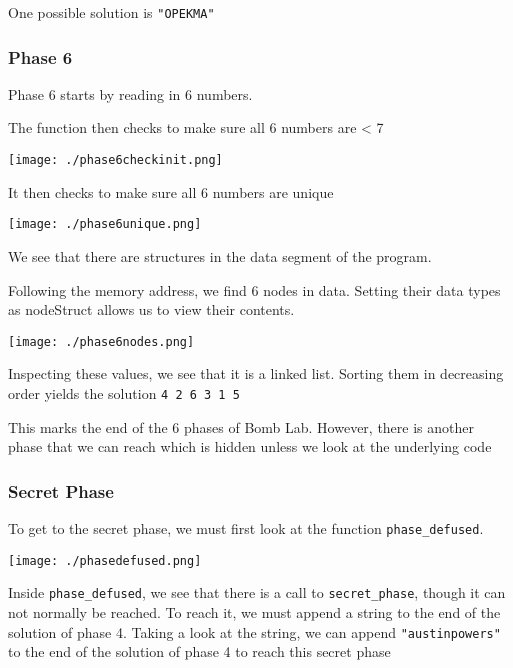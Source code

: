\documentclass[11pt]{article}
\begin{document}
One possible solution is \texttt{"OPEKMA"}
\subsubsection{Phase 6}
\label{sec:org6d4ee93}
Phase 6 starts by reading in 6 numbers.

The function then checks to make sure all 6 numbers are < 7

\begin{center}
\texttt{[image: ./phase6checkinit.png]}
\end{center}

It then checks to make sure all 6 numbers are unique

\begin{center}
\texttt{[image: ./phase6unique.png]}
\end{center}

We see that there are structures in the data segment of the program. 

Following the memory address, we find 6 nodes in data. Setting their data types as nodeStruct allows us to view their contents.

\begin{center}
\texttt{[image: ./phase6nodes.png]}
\end{center}

Inspecting these values, we see that it is a linked list. Sorting them in decreasing order yields the solution \texttt{4 2 6 3 1 5}

This marks the end of the 6 phases of Bomb Lab. However, there is another phase that we can reach which is hidden unless we look at the underlying code

\subsubsection{Secret Phase}
\label{sec:org70d3b14}
To get to the secret phase, we must first look at the function \texttt{phase\_defused}. 

\begin{center}
\texttt{[image: ./phasedefused.png]}
\end{center}

Inside \texttt{phase\_defused}, we see that there is a call to \texttt{secret\_phase}, though it can not normally be reached. To reach it, we must append a string to the end of the solution of phase 4. Taking a look at the string, we can append \texttt{"austinpowers"} to the end of the solution of phase 4 to reach this secret phase
\end{document}
